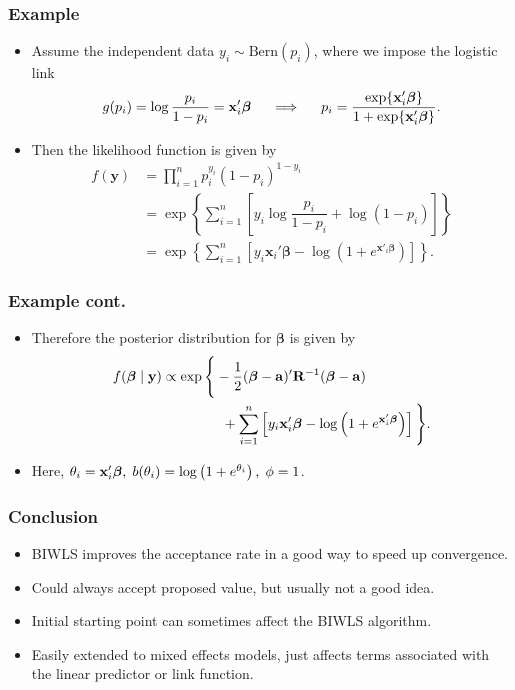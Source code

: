 \documentclass[black]{beamer}
\begin{document}
\begin{frame}
\frametitle{Example}
\begin{itemize}
\item Assume the independent data $y_i \sim \text{Bern}(p_i)$, where we impose the logistic link
\[
g(p_i) = \log \dfrac{p_i}{1-p_i} = \mathbf{x}_i'\bm\beta \hspace{5mm}\Longrightarrow\hspace{5mm} p_i = \dfrac{\exp\{\mathbf{x}_i'\bm\beta\}}{1+\exp\{\mathbf{x}_i'\bm\beta\}}.
\]
\item Then the likelihood function is given by
\begin{align*}
f(\mathbf{y}) &= \prod_{i=1}^n p_i^{y_i}(1-p_i)^{1-y_i} \\
&= \exp\left\{\sum_{i=1}^n\left[y_i\log\dfrac{p_i}{1-p_i} + \log (1-p_i)\right]\right\} \\
&= \exp\left\{\sum_{i=1}^n\left[y_i\mathbf{x}_i'\bm\beta - \log\left(1+e^{\mathbf{x}'_i\bm\beta}\right)\right]\right\}.
\end{align*}
\end{itemize}
\end{frame}

\begin{frame}
\frametitle{Example cont.}
\begin{itemize}
\item Therefore the posterior distribution for $\bm\beta$ is given by
\begin{align*}
f(\bm\beta\mid \mathbf{y}) &\propto \exp\Bigg{\{}-\frac{1}{2}(\bm\beta - \mathbf{a})'\mathbf{R}^{-1}(\bm\beta - \mathbf{a}) \\
&\hspace{15mm} + \sum_{i=1}^n\left[y_i\mathbf{x}_i'\bm\beta - \log\left(1+e^{\mathbf{x}'_i\bm\beta}\right)\right]\Bigg{\}}.
\end{align*}
\item Here, $\theta_i = \mathbf{x}_i'\bm\beta, \hspace{1mm}
b(\theta_i) = \log\left(1+e^{\theta_i}\right), \hspace{1mm}\phi=1$.
\end{itemize}
\end{frame}


\begin{frame}
\frametitle{Conclusion}
\begin{itemize}
\item BIWLS improves the acceptance rate in a good way to speed up convergence.
\vspace{0.2cm}
\item Could always accept proposed value, but usually not a good idea.
\vspace{0.2cm}
\item Initial starting point can sometimes affect the BIWLS algorithm.
\vspace{0.2cm}
\item Easily extended to mixed effects models, just affects terms associated with the linear predictor or link function.
\end{itemize}
\end{frame}
\end{document}
